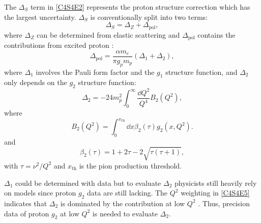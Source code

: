The $\Delta_S$ term in \cref{C4S4E2} represents the proton structure correction which has the largest uncertainty. $\Delta_S$ is conventionally split into two terms:
\begin{equation} \label{C4S4E3}
\Delta_S = \Delta_Z+\Delta_{\mathrm{pol}},
\end{equation}
where $\Delta_Z$ can be determined from elastic scattering \cite{GEP} and $\Delta_{\mathrm{pol}}$ contains the contributions from excited proton \cite{Iddings1965,Faustov2002}:
\begin{equation} \label{C4S4E4}
\Delta_{\text{pol}} = \frac{\alpha m_e}{\pi g_pm_p}(\Delta_1+\Delta_2),
\end{equation}
where $\Delta_1$ involves the Pauli form factor and the $g_1$ structure function, and $\Delta_2$ only depends on the $g_2$ structure function:
\begin{equation} \label{C4S4E5}
\Delta_2 = -24m_p^2\int_0^{\infty}\frac{\dd{Q}^2}{Q^4}B_2(Q^2),
\end{equation}
where
\begin{equation} \label{C4S4E6}
B_2(Q^2) = \int_0^{x_{\mathrm{th}}}\dd{x}\beta_2(\tau)g_2(x,Q^2).
\end{equation}
and
\begin{equation} \label{C4S4E7}
\beta_2(\tau) = 1+2\tau-2\sqrt{\tau(\tau+1)},
\end{equation}
with $\tau=\nu^2/Q^2$ and $x_{\mathrm{th}}$ is the pion production threshold.

$\Delta_1$ could be determined with data but to evaluate $\Delta_2$ physicists still heavily rely on models since proton $g_2$ data are still lacking. The $Q^2$ weighting in \cref{C4S4E5} indicates that $\Delta_2$ is dominated by the contribution at low $Q^2$ \cite{Nazaryan2006}. Thus, precision data of proton $g_2$ at low $Q^2$ is needed to evaluate $\Delta_2$.

